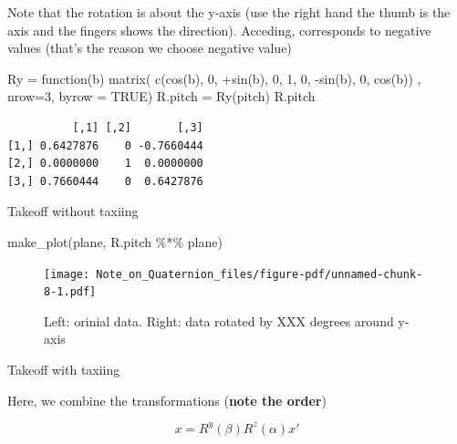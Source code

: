 \documentclass[
  letterpaper,
  DIV=11,
  numbers=noendperiod]{scrartcl}
\newenvironment{Shaded}{\begin{snugshade}}{\end{snugshade}}
\newcommand{\AttributeTok}[1]{\textcolor[rgb]{0.40,0.45,0.13}{#1}}
\newcommand{\ConstantTok}[1]{\textcolor[rgb]{0.56,0.35,0.01}{#1}}
\newcommand{\ControlFlowTok}[1]{\textcolor[rgb]{0.00,0.23,0.31}{#1}}
\newcommand{\DecValTok}[1]{\textcolor[rgb]{0.68,0.00,0.00}{#1}}
\newcommand{\FunctionTok}[1]{\textcolor[rgb]{0.28,0.35,0.67}{#1}}
\newcommand{\NormalTok}[1]{\textcolor[rgb]{0.00,0.23,0.31}{#1}}
\newcommand{\OtherTok}[1]{\textcolor[rgb]{0.00,0.23,0.31}{#1}}
\newcommand{\SpecialCharTok}[1]{\textcolor[rgb]{0.37,0.37,0.37}{#1}}
\begin{document}
Note that the rotation is about the y-axis (use the right hand the thumb
is the axis and the fingers shows the direction). Acceding, corresponds
to negative values (that's the reason we choose negative value)

\begin{Shaded}
\begin{Highlighting}[]
\NormalTok{Ry }\OtherTok{=} \ControlFlowTok{function}\NormalTok{(b) }\FunctionTok{matrix}\NormalTok{(}
      \FunctionTok{c}\NormalTok{(}\FunctionTok{cos}\NormalTok{(b), }\DecValTok{0}\NormalTok{, }\SpecialCharTok{+}\FunctionTok{sin}\NormalTok{(b), }\DecValTok{0}\NormalTok{, }\DecValTok{1}\NormalTok{, }\DecValTok{0}\NormalTok{, }\SpecialCharTok{{-}}\FunctionTok{sin}\NormalTok{(b), }\DecValTok{0}\NormalTok{, }\FunctionTok{cos}\NormalTok{(b))}
\NormalTok{      , }\AttributeTok{nrow=}\DecValTok{3}\NormalTok{, }\AttributeTok{byrow =} \ConstantTok{TRUE}\NormalTok{) }
\NormalTok{R.pitch }\OtherTok{=} \FunctionTok{Ry}\NormalTok{(pitch) }
\NormalTok{R.pitch}
\end{Highlighting}
\end{Shaded}

\begin{verbatim}
          [,1] [,2]       [,3]
[1,] 0.6427876    0 -0.7660444
[2,] 0.0000000    1  0.0000000
[3,] 0.7660444    0  0.6427876
\end{verbatim}

Takeoff without taxiing

\begin{Shaded}
\begin{Highlighting}[]
\FunctionTok{make\_plot}\NormalTok{(plane, R.pitch }\SpecialCharTok{\%*\%}\NormalTok{ plane)}
\end{Highlighting}
\end{Shaded}

\begin{figure}[H]

{\centering \texttt{[image: Note\_on\_Quaternion\_files/figure-pdf/unnamed-chunk-8-1.pdf]}

}

\caption{Left: orinial data. Right: data rotated by XXX degrees around
y-axis}

\end{figure}

Takeoff with taxiing

Here, we combine the transformations (\textbf{note the order})

\[
x=R^{y}(\beta)R^z(\alpha)x'
\]
\end{document}
